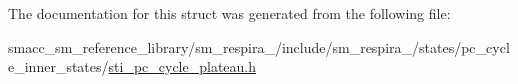 The documentation for this struct was generated from the following file\+:\begin{DoxyCompactItemize}
\item 
smacc\+\_\+sm\+\_\+reference\+\_\+library/sm\+\_\+respira\+\_/include/sm\+\_\+respira\+\_/states/pc\+\_\+cycle\+\_\+inner\+\_\+states/\hyperlink{sti__pc__cycle__plateau_8h}{sti\+\_\+pc\+\_\+cycle\+\_\+plateau.\+h}\end{DoxyCompactItemize}
